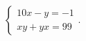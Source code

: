 $\displaystyle
\left\{
\begin{array}{l}
\displaystyle 10 x - y = -1 \\
\displaystyle xy + yx = 99
\end{array}
\right.
$.
